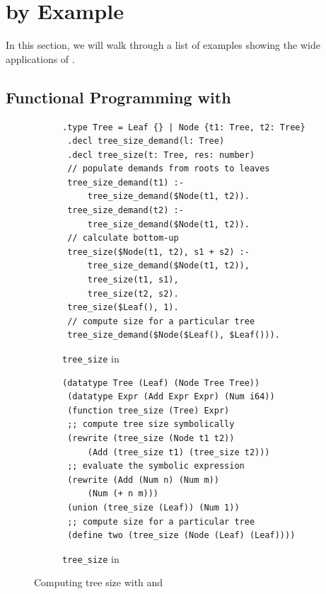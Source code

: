 \section{\Egglog by Example}\label{sec:pearls}

In this section, we will walk through a list of examples
 showing the wide applications of \egglog.

\subsection{Functional Programming with \Egglog}\label{sec:funprog}

 \begin{figure}
     \centering
     \begin{subfigure}[t]{0.45\linewidth}
         \centering
 \begin{lstlisting}[language=Souffle]
 .type Tree = Leaf {} | Node {t1: Tree, t2: Tree}
 .decl tree_size_demand(l: Tree)
 .decl tree_size(t: Tree, res: number)
 // populate demands from roots to leaves
 tree_size_demand(t1) :-
     tree_size_demand($Node(t1, t2)).
 tree_size_demand(t2) :-
     tree_size_demand($Node(t1, t2)).
 // calculate bottom-up
 tree_size($Node(t1, t2), s1 + s2) :-
     tree_size_demand($Node(t1, t2)),
     tree_size(t1, s1),
     tree_size(t2, s2).
 tree_size($Leaf(), 1).
 // compute size for a particular tree
 tree_size_demand($Node($Leaf(), $Leaf())).
         \end{lstlisting}
         \caption{\texttt{tree\_size} in \souffle}
         \label{fig:treesize:souffle}
     \end{subfigure}
     \hfill
     \begin{subfigure}[t]{0.45\linewidth}
         \begin{lstlisting}[language=egglog]
 (datatype Tree (Leaf) (Node Tree Tree))
 (datatype Expr (Add Expr Expr) (Num i64))
 (function tree_size (Tree) Expr)
 ;; compute tree size symbolically
 (rewrite (tree_size (Node t1 t2))
     (Add (tree_size t1) (tree_size t2)))
 ;; evaluate the symbolic expression
 (rewrite (Add (Num n) (Num m))
     (Num (+ n m)))
 (union (tree_size (Leaf)) (Num 1))
 ;; compute size for a particular tree
 (define two (tree_size (Node (Leaf) (Leaf))))
         \end{lstlisting}
         \caption{\texttt{tree\_size} in \Egglog}
         \label{fig:treesize:egglog}
     \end{subfigure}
     \caption{Computing tree size with \souffle and \egglog}
 \end{figure}

